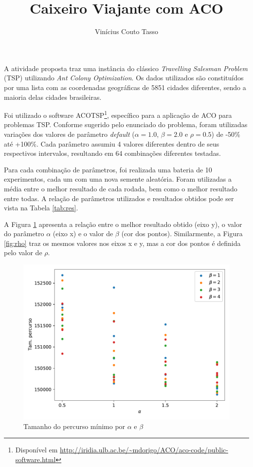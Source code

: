 \documentclass{article}
\title{Caixeiro Viajante com ACO}
\author{Vinícius Couto Tasso}
\begin{document}
\maketitle

A atividade proposta traz uma instância do clássico \textit{Travelling Salesman Problem} (TSP) utilizando \textit{Ant Colony Optimization}. Os dados utilizados são constituídos por uma lista com as coordenadas geográficas de 5851 cidades diferentes, sendo a maioria delas cidades brasileiras.

Foi utilizado o software ACOTSP\footnote{Disponível em \url{http://iridia.ulb.ac.be/~mdorigo/ACO/aco-code/public-software.html}}, específico para a aplicação de ACO para problemas TSP. Conforme sugerido pelo enunciado do problema, foram utilizadas variações dos valores de parâmetro \textit{default} ($\alpha=1.0$, $\beta=2.0$ e $\rho=0.5$) de -50\% até +100\%. Cada parâmetro assumiu 4 valores diferentes dentro de seus respectivos intervalos, resultando em 64 combinações diferentes testadas.

Para cada combinação de parâmetros, foi realizada uma bateria de 10 experimentos, cada um com uma nova semente aleatória. Foram utilizadas a média entre o melhor resultado de cada rodada, bem como o melhor resultado entre todas. A relação de parâmetros utilizados e resultados obtidos pode ser vista na Tabela \ref{tab:res}.

A Figura \ref{fig:beta} apresenta a relação entre o melhor resultado obtido (eixo y), o valor do parâmetro $\alpha$ (eixo x) e o valor de $\beta$ (cor dos pontos). Similarmente, a Figura \ref{fig:rho} traz os mesmos valores nos eixos x e y, mas a cor dos pontos é definida pelo valor de $\rho$.

\begin{figure}[htbp!]
  \centering
  \includegraphics[scale=0.8]{beta.pdf}
  \caption{Tamanho do percurso mínimo por $\alpha$ e $\beta$}
  \label{fig:beta}
\end{figure}
\end{document}
